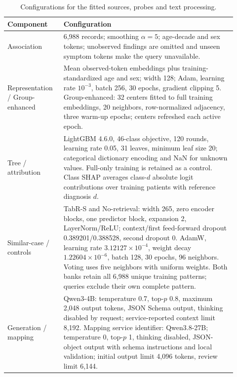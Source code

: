 \begin{table}[!tbp]\centering\footnotesize
\caption{Configurations for the fitted sources, probes and text processing.}\label{tab:rerun-config}
\begin{tabular}{p{0.22\linewidth}p{0.70\linewidth}}\toprule
Component & Configuration \\ \midrule
Association & 6,988 records; smoothing $\alpha=5$; age-decade and sex tokens; unobserved findings are omitted and unseen symptom tokens make the query unavailable. \\
Representation / Group-enhanced & Mean observed-token embeddings plus training-standardized age and sex; width 128; Adam, learning rate $10^{-3}$, batch 256, 30 epochs, gradient clipping 5. Group-enhanced: 32 centers fitted to full training embeddings, 20 neighbors, row-normalized adjacency, three warm-up epochs; centers refreshed each active epoch. \\
Tree / attribution & LightGBM 4.6.0, 46-class objective, 120 rounds, learning rate 0.05, 31 leaves, minimum leaf size 20; categorical dictionary encoding and NaN for unknown values. Full-only training is retained as a control. Class SHAP averages class-$d$ absolute logit contributions over training patients with reference diagnosis $d$.  \\
Similar-case / controls & TabR-S and No-retrieval: width 265, zero encoder blocks, one predictor block, expansion 2, LayerNorm/ReLU; context/first feed-forward dropout 0.389201/0.388528, second dropout 0. AdamW, learning rate $3.12127\!\times\!10^{-4}$, weight decay $1.22604\!\times\!10^{-6}$, batch 128, 30 epochs, 96 neighbors. Voting uses five neighbors with uniform weights. Both banks retain all 6,988 unique training patterns; queries exclude their own complete pattern. \\
Generation / mapping & Qwen3-4B: temperature 0.7, top-$p$ 0.8, maximum 2,048 output tokens, JSON Schema output, thinking disabled by request; service-reported context limit 8,192. Mapping service identifier: Qwen3.8-27B; temperature 0, top-$p$ 1, thinking disabled, JSON-object output with schema instructions and local validation; initial output limit 4,096 tokens, review limit 6,144. \\
\bottomrule\end{tabular}

\end{table}

